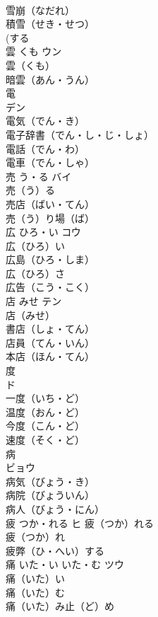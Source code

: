 \documentclass[8pt]{extreport}
\begin{document}
\begin{CJK}{UTF8}{min}
\\	雪崩（なだれ）　
\\	積雪（せき・せつ）　
\\	(する 
\\	雲	くも	ウン	
\\	雲（くも）　
\\	暗雲（あん・うん）　
\\	電	
\\	デン	
\\	電気（でん・き）　
\\	電子辞書（でん・し・じ・しょ）　
\\	電話（でん・わ）　
\\	電車（でん・しゃ）　
\\	売	う・る	バイ	
\\	売（う）る　
\\	売店（ばい・てん）　
\\	売（う）り場（ば）　
\\	広	ひろ・い	コウ	
\\	広（ひろ）い　
\\	広島（ひろ・しま）　
\\	広（ひろ）さ　
\\	広告（こう・こく）　
\\	店	みせ	テン	
\\	店（みせ）　
\\	書店（しょ・てん）　
\\	店員（てん・いん）　
\\	本店（ほん・てん）　
\\	度	
\\	ド	
\\	一度（いち・ど）　
\\	温度（おん・ど）　
\\	今度（こん・ど）　
\\	速度（そく・ど）　
\\	病	
\\	ビョウ	
\\	病気（びょう・き）　
\\	病院（びょういん）　
\\	病人（びょう・にん）　
\\	疲	つか・れる	ヒ		疲（つか）れる　
\\	疲（つか）れ　
\\	疲弊（ひ・へい）する　
\\	痛	いた・い いた・む	ツウ	
\\	痛（いた）い　
\\	痛（いた）む　
\\	痛（いた）み止（ど）め　

\end{CJK}
\end{document}
